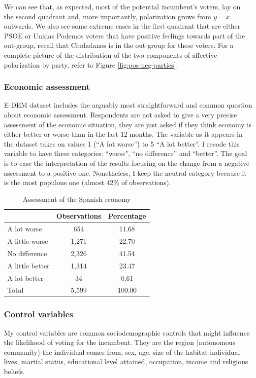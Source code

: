 \documentclass[a4paper, svgnames]{article}
\begin{document}
We can see that, as expected, most of the potential incumbent's voters, lay on the second quadrant and, more importantly, polarization grows from $y=x$ outwards. We also see some extreme cases in the first quadrant that are either PSOE or Unidas Podemos voters that have positive feelings towards part of the out-group, recall that Ciudadanos is in the out-group for these voters. For a complete picture of the distribution of the two components of affective polarization by party, refer to Figure \ref{fig:pos-neg-parties}.

\subsubsection{Economic assessment}

E-DEM dataset includes the arguably most straightforward and common question about economic assessment. Respondents are not asked to give a very precise assessment of the economic situation, they are just asked if they think economy is either better or worse than in the last 12 months.
The variable as it appears in the dataset takes on values 1 (``A lot worse'') to 5 ``A lot better''. I recode this variable to have three categories: ``worse", ``no difference'' and ``better''. The goal is to ease the interpretation of the results focusing on the change from a negative assessment to a positive one. Nonetheless, I keep the neutral category because it is the most populous one (almost 42\% of observations).


\begin{table}[H]
	\centering
	\caption{Assessment of the Spanish economy}
	\label{tab:economic assessment}
	\begin{tabular}{@{}lcc@{}}
		\toprule
		                & Observations & Percentage \\ \midrule
		A lot worse     & 654          & 11.68      \\
		A little worse  & 1,271        & 22.70      \\
		No difference   & 2,326        & 41.54      \\
		A little better & 1,314        & 23.47      \\
		A lot better    & 34           & 0.61       \\
		Total           & 5,599        & 100.00     \\ \bottomrule
	\end{tabular}
\end{table}

\subsubsection{Control variables}
My control variables are common sociodemographic controls that might influence the likelihood of voting for the incumbent. They are the region (autonomous community) the individual comes from, sex, age, size of the habitat individual lives, martial status, educational level attained, occupation, income and religious beliefs.
\end{document}
